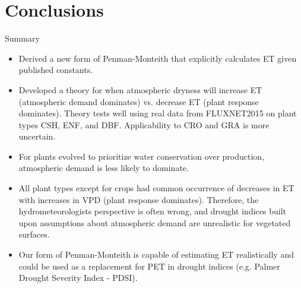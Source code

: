 \documentclass[aspectratio=169]{beamer}
\begin{document}
\section{Conclusions}


\begin{frame}{Summary}
  \small
  \begin{itemize}
  \item Derived a new form of Penman-Monteith that explicitly calculates ET given published constants.
  \item Developed a theory for when atmospheric dryness will increase ET (atmospheric demand dominates) vs. decrease ET (plant response dominates). Theory tests well using real data from FLUXNET2015 on plant types CSH, ENF, and DBF. Applicability to CRO and GRA is more uncertain.
  \item For plants evolved to prioritize water conservation over production, atmospheric demand is less likely to dominate.
  \item All plant types except for crops had common occurrence of decreases in ET with increases in VPD (plant response dominates). Therefore, the hydrometeorologists perspective is often wrong, and drought indices built upon assumptions about atmospheric demand are unrealistic for vegetated surfaces.
  \item Our form of Penman-Monteith is capable of estimating ET realistically and could be used as a replacement for PET in drought indices (e.g. Palmer Drought Severity Index - PDSI).
  \end{itemize}
\end{frame}
\end{document}
